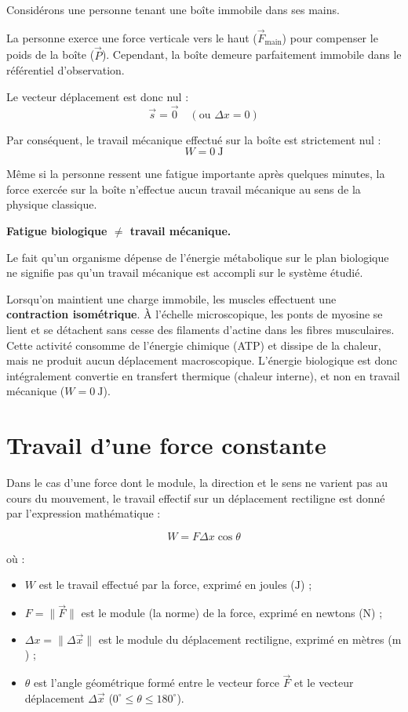 \documentclass[11pt,openany]{book}
\begin{document}
Considérons une personne tenant une boîte immobile dans ses mains.

La personne exerce une force verticale vers le haut ($\vec{F}_{\mathrm{main}}$) pour compenser le poids de la boîte ($\vec{P}$). Cependant, la boîte demeure parfaitement immobile dans le référentiel d'observation.

Le vecteur déplacement est donc nul :
\[
\vec{s} = \vec{0} \quad (\text{ou } \Delta x = 0)
\]

Par conséquent, le travail mécanique effectué sur la boîte est strictement nul :
\[
\boxed{W = 0\ \mathrm{J}}
\]

Même si la personne ressent une fatigue importante après quelques minutes, la force exercée sur la boîte n'effectue aucun travail mécanique au sens de la physique classique.

\begin{important}
\textbf{Fatigue biologique $\neq$ travail mécanique.}

Le fait qu'un organisme dépense de l'énergie métabolique sur le plan biologique ne signifie pas qu'un travail mécanique est accompli sur le système étudié. 

Lorsqu'on maintient une charge immobile, les muscles effectuent une \textbf{contraction isométrique}. À l'échelle microscopique, les ponts de myosine se lient et se détachent sans cesse des filaments d'actine dans les fibres musculaires. Cette activité consomme de l'énergie chimique (ATP) et dissipe de la chaleur, mais ne produit aucun déplacement macroscopique. L'énergie biologique est donc intégralement convertie en transfert thermique (chaleur interne), et non en travail mécanique ($W = 0\ \mathrm{J}$).
\end{important}

\section{Travail d'une force constante}

Dans le cas d'une force dont le module, la direction et le sens ne varient pas au cours du mouvement, le travail effectif sur un déplacement rectiligne est donné par l'expression mathématique :

\[
\boxed{
W = F \Delta x \cos\theta
}
\]

où :
\begin{itemize}
    \item $W$ est le travail effectué par la force, exprimé en joules ($\mathrm{J}$) ;
    \item $F = \|\vec{F}\|$ est le module (la norme) de la force, exprimé en newtons ($\mathrm{N}$) ;
    \item $\Delta x = \|\Delta \vec{x}\|$ est le module du déplacement rectiligne, exprimé en mètres ($\mathrm{m}$) ;
    \item $\theta$ est l'angle géométrique formé entre le vecteur force $\vec{F}$ et le vecteur déplacement $\Delta \vec{x}$ ($0^\circ \le \theta \le 180^\circ$).
\end{itemize}
\end{document}
